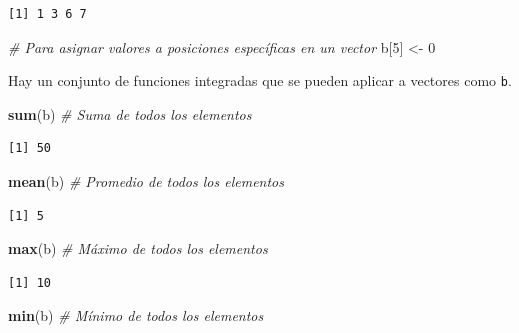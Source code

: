 \documentclass[12pt,spanish,]{book}
\newenvironment{Shaded}{\begin{snugshade}}{\end{snugshade}}
\newcommand{\CommentTok}[1]{\textcolor[rgb]{0.56,0.35,0.01}{\textit{#1}}}
\newcommand{\DecValTok}[1]{\textcolor[rgb]{0.00,0.00,0.81}{#1}}
\newcommand{\KeywordTok}[1]{\textcolor[rgb]{0.13,0.29,0.53}{\textbf{#1}}}
\newcommand{\NormalTok}[1]{#1}
\newcommand{\StringTok}[1]{\textcolor[rgb]{0.31,0.60,0.02}{#1}}
\begin{document}
\begin{verbatim}
[1] 1 3 6 7
\end{verbatim}

\begin{Shaded}
\begin{Highlighting}[]
\CommentTok{# Para asignar valores a posiciones específicas en un vector}
\NormalTok{b[}\DecValTok{5}\NormalTok{] <-}\StringTok{ }\DecValTok{0}
\end{Highlighting}
\end{Shaded}

Hay un conjunto de funciones integradas que se pueden aplicar a vectores como \texttt{b}.

\begin{Shaded}
\begin{Highlighting}[]
\KeywordTok{sum}\NormalTok{(b)      }\CommentTok{# Suma de todos los elementos}
\end{Highlighting}
\end{Shaded}

\begin{verbatim}
[1] 50
\end{verbatim}

\begin{Shaded}
\begin{Highlighting}[]
\KeywordTok{mean}\NormalTok{(b)     }\CommentTok{# Promedio de todos los elementos}
\end{Highlighting}
\end{Shaded}

\begin{verbatim}
[1] 5
\end{verbatim}

\begin{Shaded}
\begin{Highlighting}[]
\KeywordTok{max}\NormalTok{(b)      }\CommentTok{# Máximo de todos los elementos}
\end{Highlighting}
\end{Shaded}

\begin{verbatim}
[1] 10
\end{verbatim}

\begin{Shaded}
\begin{Highlighting}[]
\KeywordTok{min}\NormalTok{(b)      }\CommentTok{# Mínimo de todos los elementos}
\end{Highlighting}
\end{Shaded}
\end{document}
